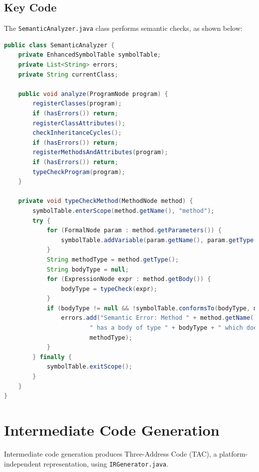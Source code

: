 \documentclass[12pt]{article}
\begin{document}
\subsection{Key Code}
The \texttt{SemanticAnalyzer.java} class performs semantic checks, as shown below:

\begin{lstlisting}[language=Java,caption={Excerpt from SemanticAnalyzer.java}]
public class SemanticAnalyzer {
    private EnhancedSymbolTable symbolTable;
    private List<String> errors;
    private String currentClass;

    public void analyze(ProgramNode program) {
        registerClasses(program);
        if (hasErrors()) return;
        registerClassAttributes();
        checkInheritanceCycles();
        if (hasErrors()) return;
        registerMethodsAndAttributes(program);
        if (hasErrors()) return;
        typeCheckProgram(program);
    }

    private void typeCheckMethod(MethodNode method) {
        symbolTable.enterScope(method.getName(), "method");
        try {
            for (FormalNode param : method.getParameters()) {
                symbolTable.addVariable(param.getName(), param.getType());
            }
            String methodType = method.getType();
            String bodyType = null;
            for (ExpressionNode expr : method.getBody()) {
                bodyType = typeCheck(expr);
            }
            if (bodyType != null && !symbolTable.conformsTo(bodyType, methodType)) {
                errors.add("Semantic Error: Method " + method.getName() + " in class " + currentClass +
                        " has a body of type " + bodyType + " which doesn't conform to the declared return type " +
                        methodType);
            }
        } finally {
            symbolTable.exitScope();
        }
    }
}
\end{lstlisting}

\section{Intermediate Code Generation}
Intermediate code generation produces Three-Address Code (TAC), a platform-independent representation, using \texttt{IRGenerator.java}.
\end{document}
